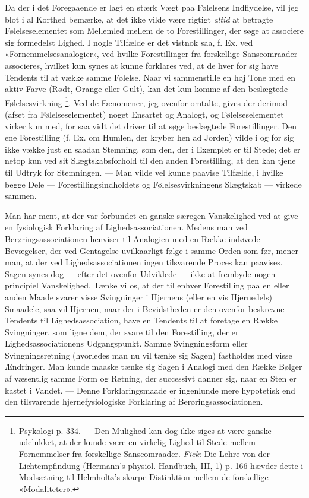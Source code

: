 \documentclass[12pt,a4paper,openany]{book}
\begin{document}
Da der i det Foregaaende er lagt en stærk Vægt paa Følelsens Indflydelse, vil
jeg blot i al Korthed bemærke, at det ikke vilde være rigtigt \emph{altid} at
betragte Følelseselementet som Mellemled mellem de to Forestillinger, der søge
at associere sig formedelst Lighed. I nogle Tilfælde er det vistnok saa, f. Ex.
ved «Fornemmelsesanalogier», ved hvilke Forestillinger fra forskellige
Sanseomraader associeres, hvilket kun synes at kunne forklares ved, at de hver
for sig have Tendents til at vække samme Følelse. Naar vi sammenstille en høj
Tone med en aktiv Farve (Rødt, Orange eller Gult), kan det kun komme af den
beslægtede Følelsesvirkning%
\footnote[1]{Psykologi p. 334. --- Den Mulighed kan dog ikke siges at være
ganske udelukket, at der kunde være en virkelig Lighed til Stede mellem
Fornemmelser fra forskellige Sanseomraader. \emph{Fick}: Die Lehre von der
Lichtempfindung (Hermann's physiol. Handbuch, III, 1) p. 166 hævder dette i
Modsætning til Helmholtz's skarpe Distinktion mellem de forskellige
«Modaliteter».}. Ved de Fænomener, jeg ovenfor omtalte, gives der derimod
(afset fra Følelseselementet) noget Ensartet og Analogt, og Følelseselementet
virker kun med, for saa vidt det driver til at søge beslægtede Forestillinger.
Den ene Forestilling (f. Ex. om Humlen, der kryber hen ad Jorden) vilde i og
for sig ikke vække just en saadan Stemning, som den, der i Exemplet er til
Stede; det er netop kun ved sit Slægtskabsforhold til den anden Forestilling,
at den kan tjene til Udtryk for Stemningen. --- Man vilde vel kunne paavise
Tilfælde, i hvilke begge Dele --- Forestillingsindholdets og
Følelsesvirkningens Slægtskab --- virkede sammen.

Man har ment, at der var forbundet en ganske særegen Vanskelighed ved at give
en fysiologisk Forklaring af Lighedsassociationen. Medens man ved
Berøringsassociationen henviser til Analogien med en Række indøvede Bevægelser,
der ved Gentagelse uvilkaarligt følge i samme Orden som før, mener man, at der
ved Lighedsassociationen ingen tilsvarende Proces kan paavises. Sagen synes dog
--- efter det ovenfor Udviklede --- ikke at frembyde nogen principiel
Vanskelighed. Tænke vi os, at der til enhver Forestilling paa en eller anden
Maade svarer visse Svingninger i Hjernens (eller en vis Hjernedels) Smaadele,
saa vil Hjernen, naar der i Bevidstheden er den ovenfor beskrevne Tendents til
Lighedsassociation, have en Tendents til at foretage en Række Svingninger, som
ligne dem, der svare til den Forestilling, der er Lighedsassociationens
Udgangspunkt. Samme Svingningsform eller Svingningsretning (hvorledes man nu
vil tænke sig Sagen) fastholdes med visse Ændringer. Man kunde maaske tænke sig
Sagen i Analogi med den Række Bølger af væsentlig samme Form og Retning, der
successivt danner sig, naar en Sten er kastet i Vandet. --- Denne
Forklaringsmaade er ingenlunde mere hypotetisk end den tilsvarende
hjernefysiologiske Forklaring af Berøringsassociationen.
\end{document}
